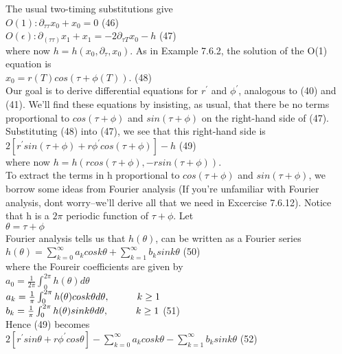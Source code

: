 \documentclass{article}
\newcommand\tab[1][1cm]{\hspace*{#1}}
\begin{document}
The usual two-timing substitutions give  \\ \tab
$O(1): \partial_{\tau \tau}x_{0}+x_{0}=0$ \tab (46) \\ 
$O(\epsilon): \partial_(\tau \tau) x_{1}+x_{1}=-2\partial_{\tau T} x_{0}-h$ \tab (47) \\ 
where now $h=h(x_{0}, \partial_{\tau}, x_{0})$. As in Example 7.6.2, the solution of the O(1) equation is \\ \tab
$x_{0}=r(T)cos(\tau + \phi(T))$. \tab (48) \\
Our goal is to derive differential equations for $r^{'}$ and $\phi^{'}$, analogous to (40) and (41). We'll find these equations by insisting, as usual, that there be no terms proportional to $cos(\tau + \phi)$ and $sin(\tau + \phi)$ on the right-hand side of (47). Substituting (48) into (47), we see that this right-hand side is \\ \tab
$2[r^{'}sin(\tau + \phi)+r\phi^{'}cos(\tau + \phi)]-h$ \tab (49) \\
where now $h=h(rcos(\tau+\phi), -rsin(\tau+\phi))$. \\ \tab
To extract the terms in h proportional to $cos(\tau+\phi)$ and $sin(\tau + \phi)$, we borrow some ideas from Fourier analysis (If you're unfamiliar with Fourier analysis, dont worry--we'll derive all that we need in Excercise 7.6.12). Notice that h is a $2\pi$ periodic function of $\tau + \phi$. Let \\ \tab
$\theta = \tau + \phi$ \\ \tab
Fourier analysis tells us that $h(\theta)$, can be written as a Fourier series \\ \tab
$h(\theta)=\sum_{k=0}^{\infty}a_{k}cosk{\theta}+\sum_{k=1}^{\infty}b_{k}sink\theta$ \tab (50) \\
where the Foureir coefficients are given by \\ \tab
$a_{0}=\frac{1}{2\pi}\int_{0}^{2\pi}h(\theta)d\theta$ \\ \tab
$a_{k}=\frac{1}{\pi}\int_{0}^{2\pi}h(\theta)cos k \theta d\theta, \tab k \geq 1$ \\ \tab
$b_{k}=\frac{1}{\pi}\int_{0}^{2\pi}h(\theta)sink\theta d\theta, \tab k \geq 1$ \tab (51) \\
Hence (49) becomes \\ \tab
$2[r^{'}sin\theta + r \phi^{'}cos\theta]-\sum_{k=0}^{\infty} a_{k} cos k\theta - \sum_{k=1}^{\infty} b_{k}sink\theta$ \tab (52) \\
\end{document}
